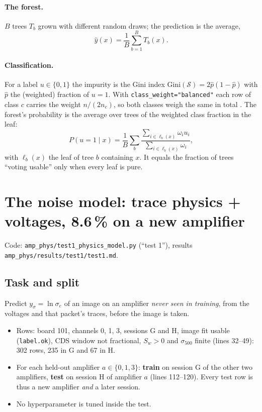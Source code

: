 \documentclass[10pt,a4paper]{article}
\newcommand{\code}[1]{\texttt{\small #1}}
\begin{document}
\paragraph{The forest.} $B$ trees $T_b$ grown with different random draws; the prediction is the average,
\begin{equation}
\hat y(x)=\frac1B\sum_{b=1}^{B}T_b(x).
\end{equation}

\paragraph{Classification.} For a label $u\in\{0,1\}$ the impurity is the Gini index $\mathrm{Gini}(\mathcal S)=2\hat p(1-\hat p)$ with
$\hat p$ the (weighted) fraction of $u=1$. With \code{class\_weight="balanced"} each row of class $c$ carries the weight
$n/(2n_c)$, so both classes weigh the same in total \cite{pedregosa2011}. The forest's probability is the average over trees of
the weighted class fraction in the leaf:
\begin{equation}
P(u=1\mid x)=\frac1B\sum_b \frac{\sum_{i\in\ell_b(x)}\omega_i u_i}{\sum_{i\in\ell_b(x)}\omega_i},
\end{equation}
with $\ell_b(x)$ the leaf of tree $b$ containing $x$. It equals the fraction of trees ``voting usable'' only when every
leaf is pure.

\section{The noise model: trace physics + voltages, 8.6\,\% on a new amplifier}\label{sec:noise}

Code: \code{amp\_phys/test1\_physics\_model.py} (``test 1''), results \code{amp\_phys/results/test1/test1.md}.

\subsection{Task and split}
Predict $y_\sigma=\ln\sigma_e$ of an image on an amplifier \emph{never seen in training}, from the voltages and that packet's
traces, before the image is taken.
\begin{itemize}
\item Rows: board 101, channels 0, 1, 3, sessions G and H, image fit usable (\code{label.ok}), CDS window not
  fractional, $S_w>0$ and $\sigma_{500}$ finite (lines 32--49): 302 rows, 235 in G and 67 in H.
\item For each held-out amplifier $a\in\{0,1,3\}$: \textbf{train} on session G of the other two amplifiers, \textbf{test} on
  session H of amplifier $a$ (lines 112--120). Every test row is thus a new amplifier \emph{and} a later session.
\item No hyperparameter is tuned inside the test.
\end{itemize}
\end{document}
